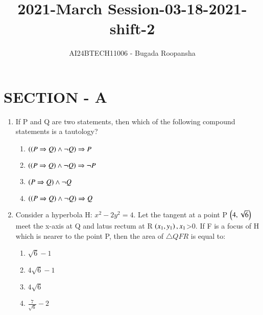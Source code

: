 \documentclass[journal,12pt,twocolumn]{IEEEtran}
\theoremstyle{remark}
\begin{document}

\vspace{3cm}
\title{2021-March Session-03-18-2021-shift-2}
\author{AI24BTECH11006 - Bugada Roopansha}
\maketitle
\section{SECTION - A}
\begin{enumerate}[start=16]
\item If P and Q are two statements, then which of the following compound statements is a tautology?
\begin{enumerate}
    
\item  $\left(\left(P \Rightarrow Q\right) \land \neg Q\right) \Rightarrow P$ 
\item   $\left(\left(P \Rightarrow Q\right) \land \neg Q\right) \Rightarrow \neg P $
\item $ \left(P \Rightarrow Q\right) \land \neg Q$ 
\item  $\left(\left(P \Rightarrow Q\right) \land \neg Q\right) \Rightarrow Q $


\end{enumerate}
\item  Consider a hyperbola H: $x^2 -2y^2=4$. Let the tangent at a point P $\left(4,\sqrt{6}\right)$ meet the x-axis at Q and latus rectum at R $\left(x_1,y_1\right) , x_1 $\textgreater 0. If F is a focus of H which is nearer to the point P, then the area of $\triangle{QFR}$ is equal to:
\begin{enumerate}
\item $\sqrt{6} - 1$
\item  $4\sqrt{6} - 1$
\item  $4\sqrt{6} $
\item $\frac{7}{\sqrt{6}} - 2 $



\end{enumerate}
\end{enumerate}
\end{document}
